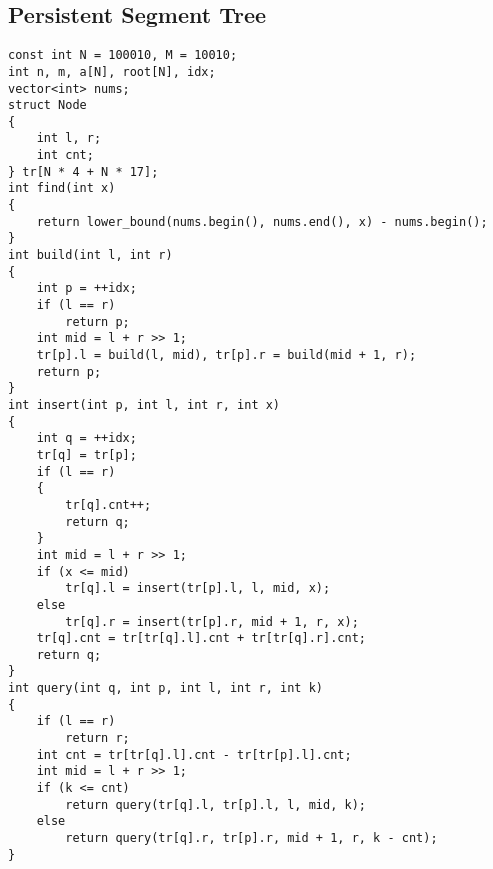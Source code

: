 \subsection{Persistent Segment Tree}
\begin{lstlisting}
const int N = 100010, M = 10010;
int n, m, a[N], root[N], idx;
vector<int> nums;
struct Node
{
    int l, r;
    int cnt;
} tr[N * 4 + N * 17];
int find(int x)
{
    return lower_bound(nums.begin(), nums.end(), x) - nums.begin();
}
int build(int l, int r)
{
    int p = ++idx;
    if (l == r)
        return p;
    int mid = l + r >> 1;
    tr[p].l = build(l, mid), tr[p].r = build(mid + 1, r);
    return p;
}
int insert(int p, int l, int r, int x)
{
    int q = ++idx;
    tr[q] = tr[p];
    if (l == r)
    {
        tr[q].cnt++;
        return q;
    }
    int mid = l + r >> 1;
    if (x <= mid)
        tr[q].l = insert(tr[p].l, l, mid, x);
    else
        tr[q].r = insert(tr[p].r, mid + 1, r, x);
    tr[q].cnt = tr[tr[q].l].cnt + tr[tr[q].r].cnt;
    return q;
}
int query(int q, int p, int l, int r, int k)
{
    if (l == r)
        return r;
    int cnt = tr[tr[q].l].cnt - tr[tr[p].l].cnt;
    int mid = l + r >> 1;
    if (k <= cnt)
        return query(tr[q].l, tr[p].l, l, mid, k);
    else
        return query(tr[q].r, tr[p].r, mid + 1, r, k - cnt);
}
\end{lstlisting}
